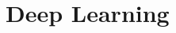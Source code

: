 \documentclass[../build/book.tex]{subfiles}
\begin{document}
\chapter{Deep Learning}
\end{document}
